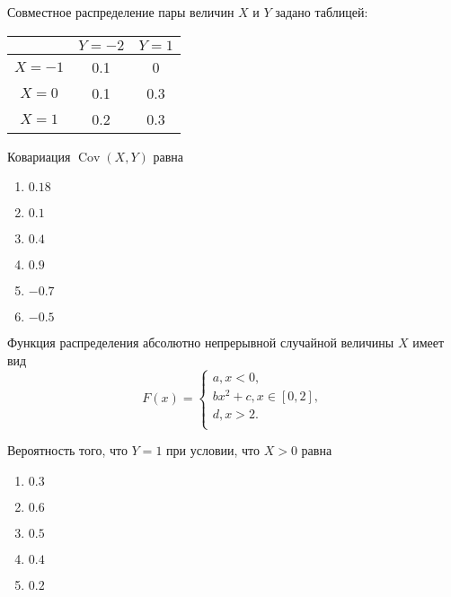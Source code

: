 \documentclass[t]{beamer}
\DeclareMathOperator{\Cov}{Cov}
\begin{document}
 \begin{frame} \label{16} 
\begin{block}{16} 

Совместное распределение пары величин $X$ и $Y$ задано таблицей:

\begin{center}
\begin{tabular}{c|cc}
 & $Y=-2$ & $Y=1$ \\
\hline
$X=-1$ & 0.1 & 0 \\
$X=0$ & 0.1 & 0.3 \\
$X=1$ & 0.2 & 0.3 \\
\end{tabular}
\end{center}
\vspace{0.2cm} 
 
 
Ковариация $\Cov(X, Y)$ равна
 


 \end{block} 
\begin{enumerate} 
\item[] \hyperlink{16-Yes}{\beamergotobutton{} $0.18$}
\item[] \hyperlink{16-No}{\beamergotobutton{} $0.1$}
\item[] \hyperlink{16-No}{\beamergotobutton{} $0.4$}
\item[] \hyperlink{16-No}{\beamergotobutton{} $0.9$}
\item[] \hyperlink{16-No}{\beamergotobutton{} $-0.7$}
\item[] \hyperlink{16-No}{\beamergotobutton{} $-0.5$}
\end{enumerate} 
\end{frame} 


 \begin{frame} \label{17} 
\begin{block}{17} 

Функция распределения абсолютно непрерывной случайной величины $X$ имеет вид
\[
F(x)=\begin{cases}
a, x<0,\\
b x^2+c, x \in [0,2],\\
d, x > 2.\\
\end{cases}
\]
\vspace{0.2cm} 
 
 Вероятность того, что $Y = 1$ при условии, что $X > 0$ равна
 


 \end{block} 
\begin{enumerate} 
\item[] \hyperlink{17-No}{\beamergotobutton{} $0.3$}
\item[] \hyperlink{17-Yes}{\beamergotobutton{} $0.6$}
\item[] \hyperlink{17-No}{\beamergotobutton{} $0.5$}
\item[] \hyperlink{17-No}{\beamergotobutton{} $0.4$
}
\item[] \hyperlink{17-No}{\beamergotobutton{} $0.2$}
\end{enumerate} 
\end{frame} 
\end{document}
